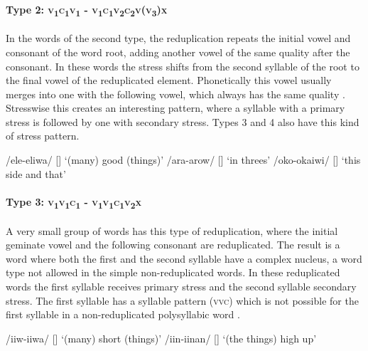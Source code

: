 \paragraph{Type 2:  \textsc{v}\textsubscript{1}\textsc{c}\textsubscript{1}\textsc{v}\textsubscript{1} - \textsc{v}\textsubscript{1}\textsc{c}\textsubscript{1}\textsc{v}\textsubscript{2}\textsc{c}\textsubscript{2}\textsc{v}(\textsc{v}\textsubscript{3})\textsc{x}}

In the words of the second type, the reduplication repeats the initial vowel and consonant of the word root, adding another vowel of the same quality after the consonant.  In these words the stress shifts from the second syllable of the root to the final vowel of the reduplicated element.  Phonetically this vowel usually merges into one with the following vowel, which always has the same quality .  Stresswise this creates an interesting pattern, where a syllable with a primary stress is followed by one with secondary stress.  Types 3 and 4 also have this kind of stress pattern.

\ea
\label{ex:2:reduptypetwo}
\ea
/ele-eliwa/  []  `(many) good (things)'
\ex
/ara-arow/  []  `in threes'
\ex
/oko-okaiwi/  []  `this side and that'
\z
\z

\paragraph{Type 3:  \textsc{v}\textsubscript{1}\textsc{v}\textsubscript{1}\textsc{c}\textsubscript{1} - \textsc{v}\textsubscript{1}\textsc{v}\textsubscript{1}\textsc{c}\textsubscript{1}\textsc{v}\textsubscript{2}\textsc{x}}

A very small group of words has this type of reduplication, where the initial geminate vowel and the following consonant are reduplicated.  The result is a word where both the first and the second syllable have a complex nucleus, a word type not allowed in the simple non-reduplicated words.  In these reduplicated words the first syllable receives primary stress and the second syllable secondary stress.  The first syllable has a syllable pattern (\textsc{vvc}) which is not possible for the first syllable in a non-reduplicated polysyllabic word .

\ea
\label{ex:2:reduptypethree}
\ea
/iiw-iiwa/  []  `(many) short (things)'
\ex
/iin-iinan/  []  `(the things) high up'
\z
\z

